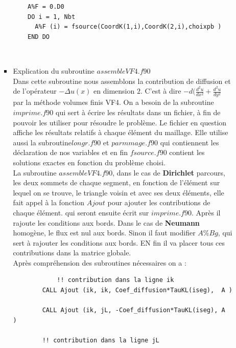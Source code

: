 \documentclass[11pt,a4paper]{scrartcl}%
\theoremstyle{plain}
\theoremstyle{definition}
\theoremstyle{remark}
\newenvironment{DDbox}[1]{
\begin{lrbox}{\BBbox}\begin{minipage}{\linewidth}}
{\end{minipage}\end{lrbox}\noindent\colorbox{Zgris}{\usebox{\BBbox}} \\
    [.5cm]}
\begin{document}
\begin{itemize}
\begin{itemize}
\begin{itemize}
		\begin{DDbox}{\linewidth}
		\begin{Verbatim}
    A%F = 0.D0 
    DO i = 1, Nbt	
      A%F (i) = fsource(CoordK(1,i),CoordK(2,i),choixpb )  
    END DO
		\end{Verbatim}
		\end{DDbox}
		\item Explication du subroutine $assembleVF4.f90$\\
		Dans cette subroutine nous assemblons la contribution de diffusion et de l'opérateur $-\Delta u(x)$ en dimension $2$. C'est à dire $-d(\frac{d^2u}{dx^2} + \frac{d^2u}{dy^2}$  par la méthode volumes finis VF4. On a besoin de la subroutine $imprime.f90$ qui sert à écrire les résultats dans un fichier, à fin de pouvoir les utiliser pour résoudre le problème. Le fichier en question affiche les résultats relatifs à chaque élément du maillage. Elle utilise aussi la subroutine$longr.f90$ et $parmmage.f90$ qui contiennent les déclaration de nos variables et en fin $fsource.f90$ contient les solutions exactes en fonction du problème choisi.\\
		La subroutine $assembleVF4.f90$, dans le cas de \textbf{Dirichlet} parcours, les deux sommets de chaque segment, en fonction de l'élément sur lequel on se trouve, le triangle voisin et avec ses deux éléments, elle fait appel à la fonction $Ajout$ pour ajouter les contributions de chaque élément.  qui seront ensuite écrit sur  $imprime.f90$. Après il rajoute les conditions aux bords. Dans le cas de \textbf{Neumann} homogène, le flux est nul aux bords. Sinon il faut modifier $A\%Bg$, qui sert à rajouter les conditions aux bords. EN fin il va placer tous ces contributions dans la matrice globale.\\
Après compréhension des subroutines nécessaires on a :\\
			\begin{DDbox}{\linewidth}
			\begin{Verbatim}
 			!! contribution dans la ligne ik
        CALL Ajout (ik, ik, Coef_diffusion*TauKL(iseg),  A )

        CALL Ajout (ik, jL, -Coef_diffusion*TauKL(iseg), A  ) 

        !! contribution dans la ligne jL


\end{Verbatim}
\end{DDbox}
\end{itemize}
\end{itemize}
\end{itemize}
\end{document}
